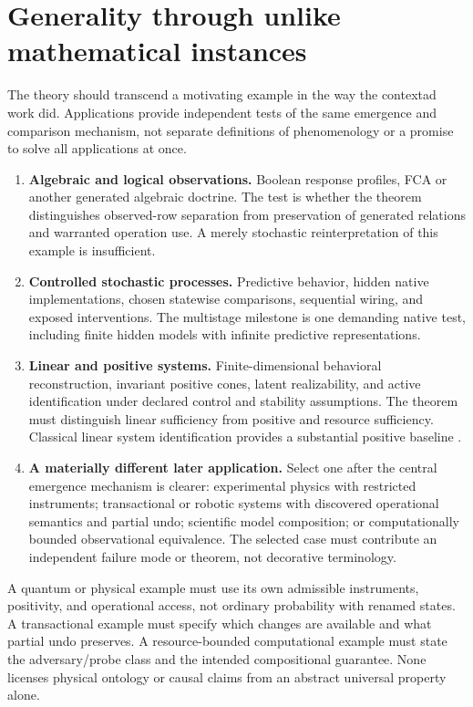 \documentclass[11pt]{article}
\theoremstyle{remark}
\begin{document}
\section{Generality through unlike mathematical instances}
\label{sec:generality}

The theory should transcend a motivating example in the way the contextad work did. Applications provide independent tests of the same emergence and comparison mechanism, not separate definitions of phenomenology or a promise to solve all applications at once.

\begin{enumerate}
\item \textbf{Algebraic and logical observations.} Boolean response profiles, FCA or another generated algebraic doctrine. The test is whether the theorem distinguishes observed-row separation from preservation of generated relations and warranted operation use. A merely stochastic reinterpretation of this example is insufficient.
\item \textbf{Controlled stochastic processes.} Predictive behavior, hidden native implementations, chosen statewise comparisons, sequential wiring, and exposed interventions. The multistage milestone is one demanding native test, including finite hidden models with infinite predictive representations.
\item \textbf{Linear and positive systems.} Finite-dimensional behavioral reconstruction, invariant positive cones, latent realizability, and active identification under declared control and stability assumptions. The theorem must distinguish linear sufficiency from positive and resource sufficiency. Classical linear system identification provides a substantial positive baseline \cite{ActiveID}.
\item \textbf{A materially different later application.} Select one after the central emergence mechanism is clearer: experimental physics with restricted instruments; transactional or robotic systems with discovered operational semantics and partial undo; scientific model composition; or computationally bounded observational equivalence. The selected case must contribute an independent failure mode or theorem, not decorative terminology.
\end{enumerate}

A quantum or physical example must use its own admissible instruments, positivity, and operational access, not ordinary probability with renamed states. A transactional example must specify which changes are available and what partial undo preserves. A resource-bounded computational example must state the adversary/probe class and the intended compositional guarantee. None licenses physical ontology or causal claims from an abstract universal property alone.
\end{document}
